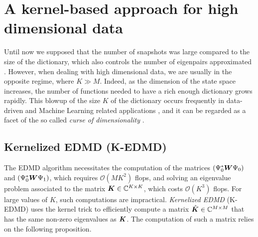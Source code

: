 \section{A kernel-based approach for high dimensional data}
Until now we supposed that the number of snapshots was large compared to the size of the dictionary, which also controls the number of eigenpairs approximated . However, when dealing with high dimensional data, we are usually in the opposite regime, where $K \gg M$. Indeed, as the dimension of the state space increases, the number of functions needed to have a rich enough dictionary grows rapidly. This blowup of the size $K$ of the dictionary occurs frequently in data-driven and Machine Learning related applications \cite{budisic_applied_2012, rowley_spectral_2009, schmid_dynamic_2010}, and it can be regarded as a facet of the so called \emph{curse of dimensionality} \cite{bishop_pattern_2006}. 

\subsection{Kernelized EDMD (K-EDMD)}
The EDMD algorithm necessitates the computation of the matrices $(\Psi_0^*\vb*{W}\Psi_0)$ and $(\Psi_0^*\vb*{W}\Psi_1)$, which requires $\mathcal{O}(MK^2)$ flops, and solving an eigenvalue problem associated to the matrix $\vb*{K}\in\mathbb{C}^{K\times K}$, which costs $\mathcal{O}(K^3)$ flops. For large values of $K$, such computations are impractical. \emph{Kernelized EDMD} (K-EDMD) \cite{williams_kernel-based_2015} uses the kernel trick \cite{bishop_pattern_2006} to efficiently compute a matrix $\hat{\vb*{K}}\in\mathbb{C}^{M\times M}$ that has the same non-zero eigenvalues as $\vb*{K}$. The computation of such a matrix relies on the following proposition.

